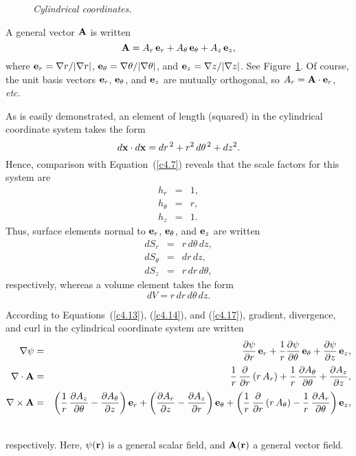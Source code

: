 \begin{figure}
\epsfysize=2.75in
\centerline{}
\caption{\em Cylindrical coordinates.}\label{fcyl}
\end{figure}

 A general  vector ${\bf A}$ is  written
\begin{equation}
{\bf A} = A_r\,{\bf e}_r+ A_\theta\,{\bf e}_\theta + A_z\,{\bf e}_z,
\end{equation}
where ${\bf e}_r=\nabla r/|\nabla r|$, ${\bf e}_\theta = \nabla\theta/|\nabla\theta|$, and ${\bf e}_z=\nabla z/|\nabla z|$. See Figure~\ref{fcyl}. Of course, the unit basis vectors
${\bf e}_r$, ${\bf e}_\theta$, and ${\bf e}_z$ are mutually orthogonal, so
$A_r = {\bf A}\cdot {\bf e}_r$, {\em etc.} 

As is easily demonstrated, an element of length (squared) in the cylindrical coordinate system takes the form
\begin{equation}
d{\bf x}\cdot d{\bf x} = dr^{\,2} + r^2\,d\theta^{\,2} + dz^2.
\end{equation}
Hence,  comparison with Equation~(\ref{c4.7}) reveals that the scale factors for this system are
\begin{eqnarray}
h_r &=& 1,\\[0.5ex]
h_\theta &=& r,\\[0.5ex]
h_z &=& 1.
\end{eqnarray}
Thus,  surface elements normal to ${\bf e}_r$, ${\bf e}_\theta$, and ${\bf e}_z$ are
written
\begin{eqnarray}
dS_r& =& r\,d\theta\,dz,\\[0.5ex]
dS_\theta &=& dr\,dz,\\[0.5ex]
dS_z &=& r\,dr\,d\theta,
\end{eqnarray}
respectively, whereas  
a
volume element takes the form
\begin{equation}
dV = r\,dr\,d\theta\,dz.
\end{equation}
 
 According to Equations~(\ref{c4.13}), (\ref{c4.14}), and (\ref{c4.17}), gradient, divergence, and curl in the cylindrical
 coordinate system are written
\begin{eqnarray}
\nabla \psi &=& \frac{\partial \psi}{\partial r}\,{\bf e}_r
+ \frac{1}{r}\frac{\partial \psi}{\partial\theta}\,{\bf e}_\theta
+ \frac{\partial \psi}{\partial z}\,{\bf e}_z,\\[0.5ex]
\nabla\cdot {\bf A} &=&\frac{1}{r}\,\frac{\partial}{\partial r}\,(r\,A_r) + \frac{1}{r}\,\frac{\partial A_\theta}{\partial\theta} + \frac{\partial A_z}{\partial z},\label{ec39}\\[0.5ex]
\nabla\times{\bf A} &=& \left(\frac{1}{r}\,\frac{\partial A_z}{\partial \theta}-\frac{\partial A_\theta}{\partial z}\right){\bf e}_r
+\left(\frac{\partial A_r}{\partial z}-\frac{\partial A_z}{\partial r}\right){\bf e}_\theta
+ \left(\frac{1}{r}\,\frac{\partial}{\partial r}\,(r\,A_\theta) - \frac{1}{r}\,\frac{\partial A_r}{\partial\theta}\right){\bf e}_z,\nonumber\\[0.5ex]&&\label{spcurl}
\end{eqnarray}
respectively. Here, $\psi({\bf r})$ is a general scalar field, and ${\bf A}({\bf r})$ a general vector field. 

